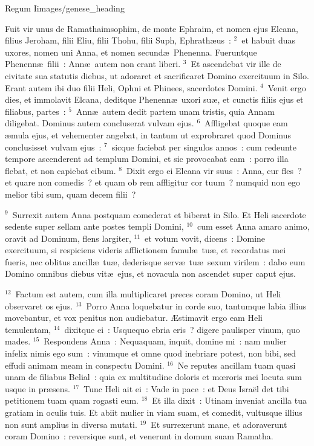 {Regum I}{images/genese_heading}


\lettrine[lines=10,image=true,loversize=0.05,lraise=-0.03]{F}{}uit vir unus de Ramathaimsophim, de monte Ephraim, et nomen ejus Elcana, filius Jeroham, filii Eliu, filii Thohu, filii Suph, Ephrath\ae us~:
${}^{2}$~et habuit duas uxores, nomen uni Anna, et nomen secund\ae\ Phenenna. Fueruntque Phenenn\ae\ filii~: Ann\ae\ autem non erant liberi.
${}^{3}$~Et ascendebat vir ille de civitate sua statutis diebus, ut adoraret et sacrificaret Domino exercituum in Silo. Erant autem ibi duo filii Heli, Ophni et Phinees, sacerdotes Domini.
${}^{4}$~Venit ergo dies, et immolavit Elcana, deditque Phenenn\ae\ uxori su\ae , et cunctis filiis ejus et filiabus, partes~:
${}^{5}$~Ann\ae\ autem dedit partem unam tristis, quia Annam diligebat. Dominus autem concluserat vulvam ejus.
${}^{6}$~Affligebat quoque eam \ae mula ejus, et vehementer angebat, in tantum ut exprobraret quod Dominus conclusisset vulvam ejus~:
${}^{7}$~sicque faciebat per singulos annos~: cum redeunte tempore ascenderent ad templum Domini, et sic provocabat eam~: porro illa flebat, et non capiebat cibum.
${}^{8}$~Dixit ergo ei Elcana vir suus~: Anna, cur fles~? et quare non comedis~? et quam ob rem affligitur cor tuum~? numquid non ego melior tibi sum, quam decem filii~?


${}^{9}$~Surrexit autem Anna postquam comederat et biberat in Silo. Et Heli sacerdote sedente super sellam ante postes templi Domini,
${}^{10}$~cum esset Anna amaro animo, oravit ad Dominum, flens largiter,
${}^{11}$~et votum vovit, dicens~: Domine exercituum, si respiciens videris afflictionem famul\ae\ tu\ae , et recordatus mei fueris, nec oblitus ancill\ae\ tu\ae , dederisque serv\ae\ tu\ae\ sexum virilem~: dabo eum Domino omnibus diebus vit\ae\ ejus, et novacula non ascendet super caput ejus.


${}^{12}$~Factum est autem, cum illa multiplicaret preces coram Domino, ut Heli observaret os ejus.
${}^{13}$~Porro Anna loquebatur in corde suo, tantumque labia illius movebantur, et vox penitus non audiebatur. \AE stimavit ergo eam Heli temulentam,
${}^{14}$~dixitque ei~: Usquequo ebria eris~? digere paulisper vinum, quo mades.
${}^{15}$~Respondens Anna~: Nequaquam, inquit, domine mi~: nam mulier infelix nimis ego sum~: vinumque et omne quod inebriare potest, non bibi, sed effudi animam meam in conspectu Domini.
${}^{16}$~Ne reputes ancillam tuam quasi unam de filiabus Belial~: quia ex multitudine doloris et mœroris mei locuta sum usque in pr\ae sens.
${}^{17}$~Tunc Heli ait ei~: Vade in pace~: et Deus Isra\"el det tibi petitionem tuam quam rogasti eum.
${}^{18}$~Et illa dixit~: Utinam inveniat ancilla tua gratiam in oculis tuis. Et abiit mulier in viam suam, et comedit, vultusque illius non sunt amplius in diversa mutati.
${}^{19}$~Et surrexerunt mane, et adoraverunt coram Domino~: reversique sunt, et venerunt in domum suam Ramatha.

